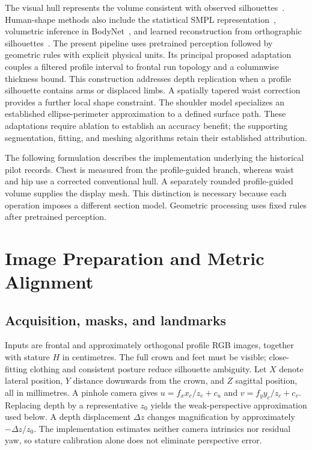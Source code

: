 \documentclass[11pt,a4paper]{article}
\begin{document}
The visual hull represents the volume consistent with observed silhouettes~\cite{laurentini1994visual}. Human-shape methods also include the statistical SMPL representation~\cite{loper2015smpl}, volumetric inference in BodyNet~\cite{varol2018bodynet}, and learned reconstruction from orthographic silhouettes~\cite{ji2019}. The present pipeline uses pretrained perception followed by geometric rules with explicit physical units. Its principal proposed adaptation couples a filtered profile interval to frontal run topology and a columnwise thickness bound. This construction addresses depth replication when a profile silhouette contains arms or displaced limbs. A spatially tapered waist correction provides a further local shape constraint. The shoulder model specializes an established ellipse-perimeter approximation to a defined surface path. These adaptations require ablation to establish an accuracy benefit; the supporting segmentation, fitting, and meshing algorithms retain their established attribution.

The following formulation describes the implementation underlying the historical pilot records. Chest is measured from the profile-guided branch, whereas waist and hip use a corrected conventional hull. A separately rounded profile-guided volume supplies the display mesh. This distinction is necessary because each operation imposes a different section model. Geometric processing uses fixed rules after pretrained perception.

\section{Image Preparation and Metric Alignment}
\subsection{Acquisition, masks, and landmarks}
Inputs are frontal and approximately orthogonal profile RGB images, together with stature $H$ in centimetres. The full crown and feet must be visible; close-fitting clothing and consistent posture reduce silhouette ambiguity. Let $X$ denote lateral position, $Y$ distance downwards from the crown, and $Z$ sagittal position, all in millimetres. A pinhole camera gives $u=f_xx_c/z_c+c_u$ and $v=f_yy_c/z_c+c_v$. Replacing depth by a representative $z_0$ yields the weak-perspective approximation used below. A depth displacement $\Delta z$ changes magnification by approximately $-\Delta z/z_0$. The implementation estimates neither camera intrinsics nor residual yaw, so stature calibration alone does not eliminate perspective error.
\end{document}
